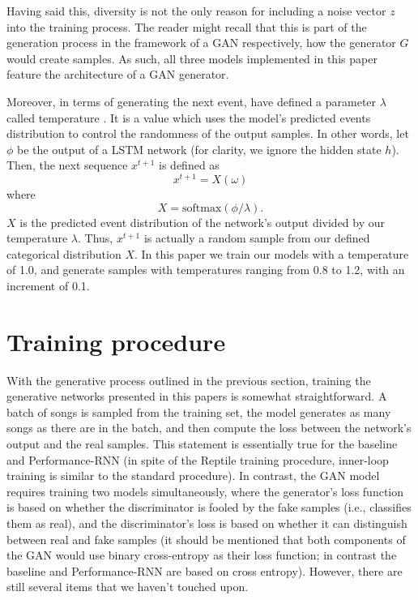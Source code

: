 \documentclass[a4paper]{book}
\begin{document}
Having said this, diversity is not the only reason for including a noise vector $z$ into the training process. The reader might recall that this is part of the generation process in the framework of a GAN respectively, how the generator $G$ would create samples. As such, all three models implemented in this paper feature the architecture of a GAN generator.

Moreover, in terms of generating the next event, \textcite{oore_this_2018} have defined a parameter $\lambda$ called temperature \parencite{google_magenta_performance_2017}. It is a value which uses the model's predicted events distribution to control the randomness of the output samples. In other words, let $\phi$ be the output of a LSTM network (for clarity, we ignore the hidden state $h$). Then, the next sequence $x^{t+1}$ is defined as 
\begin{equation}
    x^{t+1} = X(\omega)
\end{equation}
where
\begin{equation}
    X = \text{softmax}(\phi / \lambda).
\end{equation}
$X$ is the predicted event distribution of the network's output divided by our temperature $\lambda$. Thus, $x^{t+1}$ is actually a random sample from our defined categorical distribution $X$. In this paper we train our models with a temperature of 1.0, and generate samples with temperatures ranging from 0.8 to 1.2, with an increment of 0.1.

\section{Training procedure} \label{sec:reptile_train}

With the generative process outlined in the previous section, training the generative networks presented in this papers is somewhat straightforward. A batch of songs is sampled from the training set, the model generates as many songs as there are in the batch, and then compute the loss between the network's output and the real samples. This statement is essentially true for the baseline and Performance-RNN (in spite of the Reptile training procedure, inner-loop training is similar to the standard procedure). In contrast, the GAN model requires training two models simultaneously, where the generator's loss function is based on whether the discriminator is fooled by the fake samples (i.e., classifies them as real), and the discriminator's loss is based on whether it can distinguish between real and fake samples (it should be mentioned that both components of the GAN would use binary cross-entropy as their loss function; in contrast the baseline and Performance-RNN are based on cross entropy). However, there are still several items that we haven't touched upon.
\end{document}
